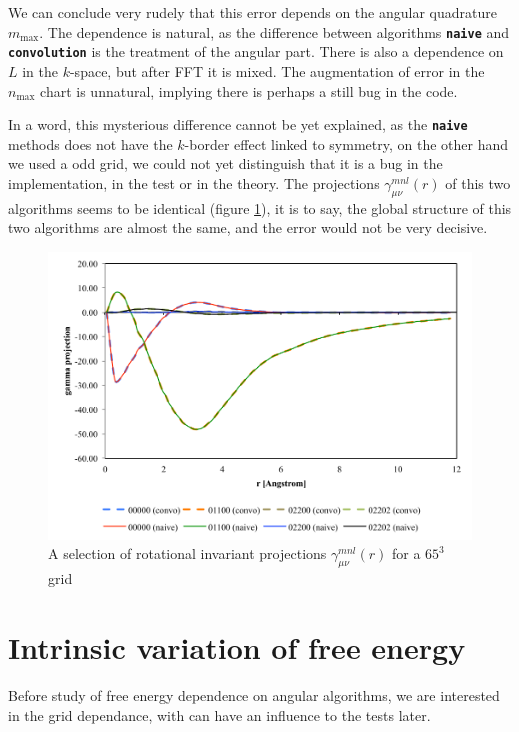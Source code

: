 We can conclude very rudely that this error depends on the angular
quadrature $m_{\max}$. The dependence is natural, as the difference
between algorithms \texttt{\textbf{naive}} and \texttt{\textbf{convolution}}
is the treatment of the angular part. There is also a dependence on
$L$ in the $k$-space, but after \acs{FFT} it is mixed. The augmentation
of error in the $n_{\max}$ chart is unnatural, implying there is
perhaps a still bug in the code.

In a word, this mysterious difference cannot be yet explained, as
the \texttt{\textbf{naive}} methods does not have the $k$-border
effect linked to symmetry, on the other hand we used a odd grid, we
could not yet distinguish that it is a bug in the implementation,
in the test or in the theory. The projections $\gamma_{\mu\nu}^{mnl}(r)$
of this two algorithms seems to be identical (figure \ref{fig:gamma-proj}),
it is to say, the global structure of this two algorithms are almost
the same, and the error would not be very decisive.

\begin{figure}[h]
\begin{centering}
\includegraphics[width=0.65\columnwidth]{_figure/results/gamma_proj}
\par\end{centering}
\caption{A selection of rotational invariant projections $\gamma_{\mu\nu}^{mnl}(r)$
for a $65^{3}$ grid\label{fig:gamma-proj}}
\end{figure}


\section{Intrinsic variation of free energy}

Before study of free energy dependence on angular algorithms, we are
interested in the grid dependance, with can have an influence to the
tests later.

